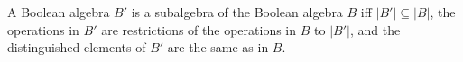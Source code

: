 A Boolean algebra $B'$ is a subalgebra of the Boolean algebra $B$ iff $|B'| \subseteq |B|$, the operations in $B'$ are restrictions of the operations in $B$ to $|B'|$, and the distinguished elements of $B'$ are the same as in $B$.
